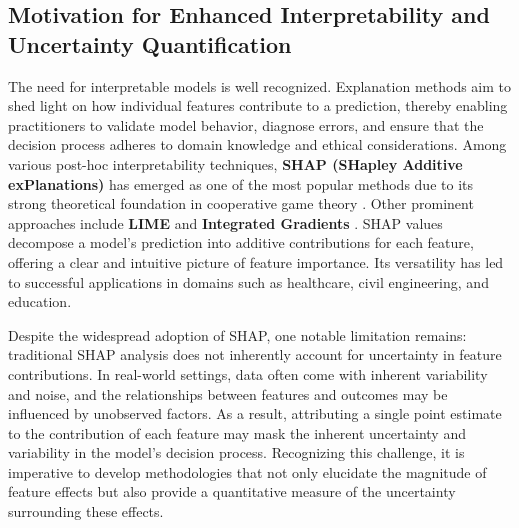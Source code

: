 \documentclass[acmlarge]{acmart}
\begin{document}
\subsection{Motivation for Enhanced Interpretability and Uncertainty Quantification}
The need for interpretable models is well recognized\cite{molnar2022interpretable,murdoch2019interpretable}. Explanation methods aim to shed light on how individual features contribute to a prediction, thereby enabling practitioners to validate model behavior, diagnose errors, and ensure that the decision process adheres to domain knowledge and ethical considerations. Among various post-hoc interpretability techniques, \textbf{SHAP (SHapley Additive exPlanations)} has emerged as one of the most popular methods due to its strong theoretical foundation in cooperative game theory \cite{lundberg2017unified}. Other prominent approaches include \textbf{LIME} \cite{ribeiro2016why} and \textbf{Integrated Gradients} \cite{sundararajan2017axiomatic}. SHAP values decompose a model's prediction into additive contributions for each feature, offering a clear and intuitive picture of feature importance. Its versatility has led to successful applications in domains such as healthcare\cite{nohara2022explanation,ogami2021artificial}, civil engineering\cite{ekanayake2022novel}, and education\cite{sahlaoui2021predicting}.

Despite the widespread adoption of SHAP, one notable limitation remains: traditional SHAP analysis does not inherently account for uncertainty in feature contributions. In real-world settings, data often come with inherent variability and noise, and the relationships between features and outcomes may be influenced by unobserved factors. As a result, attributing a single point estimate to the contribution of each feature may mask the inherent uncertainty and variability in the model's decision process. Recognizing this challenge, it is imperative to develop methodologies that not only elucidate the magnitude of feature effects but also provide a quantitative measure of the uncertainty surrounding these effects.
\end{document}
